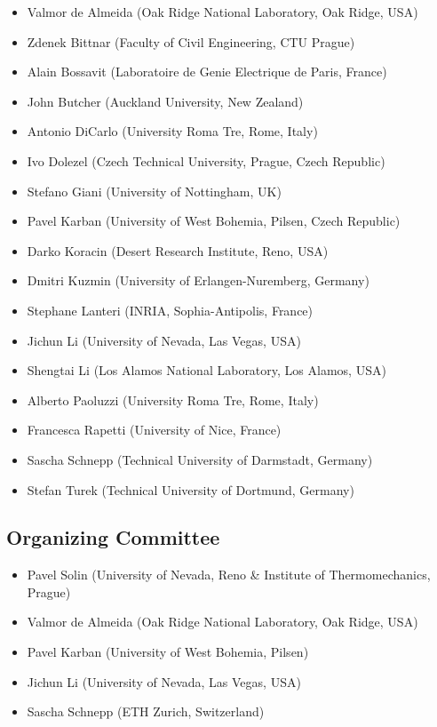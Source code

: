 \documentclass[article, A4, 11pt]{llncs}%
\begin{document}
\begin{itemize}
\item Valmor de Almeida (Oak Ridge National Laboratory, Oak Ridge, USA)
\item Zdenek Bittnar (Faculty of Civil Engineering, CTU Prague)
\item Alain Bossavit (Laboratoire de Genie Electrique de Paris, France)
\item John Butcher (Auckland University, New Zealand)
\item Antonio DiCarlo (University Roma Tre, Rome, Italy)
\item Ivo Dolezel (Czech Technical University, Prague, Czech Republic)
\item Stefano Giani (University of Nottingham, UK)
\item Pavel Karban (University of West Bohemia, Pilsen, Czech Republic)
\item Darko Koracin (Desert Research Institute, Reno, USA)
\item Dmitri Kuzmin (University of Erlangen-Nuremberg, Germany)
\item Stephane Lanteri (INRIA, Sophia-Antipolis, France)
\item Jichun Li (University of Nevada, Las Vegas, USA)
\item Shengtai Li (Los Alamos National Laboratory, Los Alamos, USA)
\item Alberto Paoluzzi (University Roma Tre, Rome, Italy)
\item Francesca Rapetti (University of Nice, France)
\item Sascha Schnepp (Technical University of Darmstadt, Germany)
\item Stefan Turek (Technical University of Dortmund, Germany)
\end{itemize}

\subsection*{Organizing Committee}

\begin{itemize}
\item Pavel Solin (University of Nevada, Reno \& Institute of Thermomechanics, Prague)
\item Valmor de Almeida (Oak Ridge National Laboratory, Oak Ridge, USA)
\item Pavel Karban (University of West Bohemia, Pilsen)
\item Jichun Li (University of Nevada, Las Vegas, USA)
\item Sascha Schnepp (ETH Zurich, Switzerland)

\end{itemize}
\end{document}
